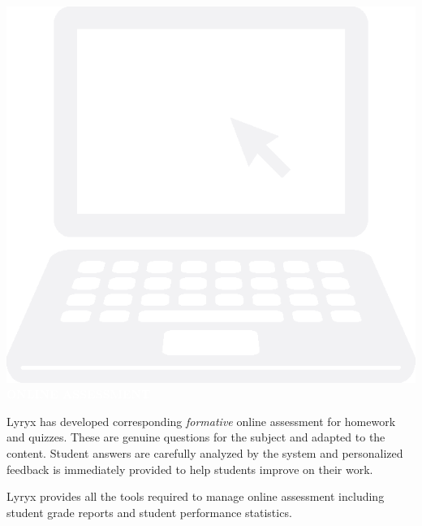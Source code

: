 \begin{center}
\begin{lscshdrbox}
\includegraphics[scale=0.08]{images/component-assess.eps}\hspace{11.75em}\textcolor{white}{\textbf{ONLINE ASSESSMENT}}
\end{lscshdrbox}
\end{center}

\begin{center}
	\parbox{0.9\linewidth}{
		Lyryx has developed corresponding \textit{formative} online assessment
		for homework and quizzes. These are genuine questions for the subject
		and adapted to the content. Student answers are carefully analyzed by
		the system and personalized feedback is immediately provided to help
		students improve on their work.
		
		\medskip
		Lyryx provides all the tools required to manage online assessment
		including student grade reports and student performance statistics.
	}
\end{center}

